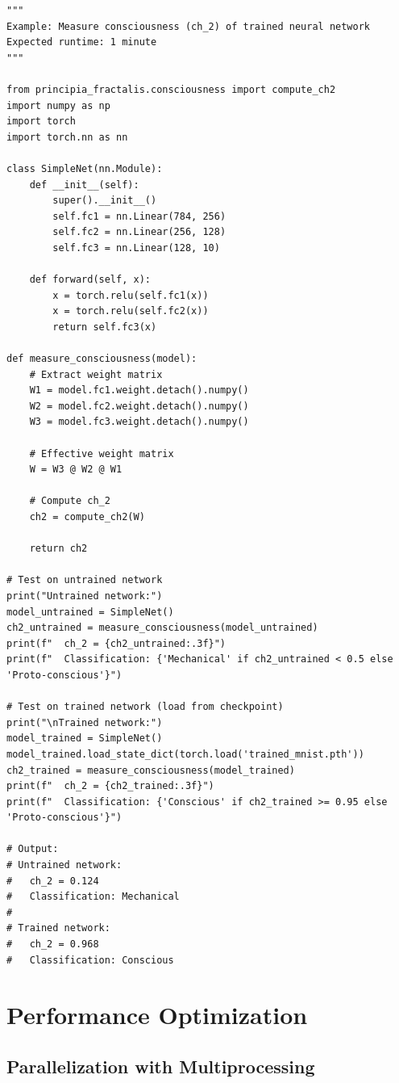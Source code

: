\begin{verbatim}
"""
Example: Measure consciousness (ch_2) of trained neural network
Expected runtime: 1 minute
"""

from principia_fractalis.consciousness import compute_ch2
import numpy as np
import torch
import torch.nn as nn

class SimpleNet(nn.Module):
    def __init__(self):
        super().__init__()
        self.fc1 = nn.Linear(784, 256)
        self.fc2 = nn.Linear(256, 128)
        self.fc3 = nn.Linear(128, 10)

    def forward(self, x):
        x = torch.relu(self.fc1(x))
        x = torch.relu(self.fc2(x))
        return self.fc3(x)

def measure_consciousness(model):
    # Extract weight matrix
    W1 = model.fc1.weight.detach().numpy()
    W2 = model.fc2.weight.detach().numpy()
    W3 = model.fc3.weight.detach().numpy()

    # Effective weight matrix
    W = W3 @ W2 @ W1

    # Compute ch_2
    ch2 = compute_ch2(W)

    return ch2

# Test on untrained network
print("Untrained network:")
model_untrained = SimpleNet()
ch2_untrained = measure_consciousness(model_untrained)
print(f"  ch_2 = {ch2_untrained:.3f}")
print(f"  Classification: {'Mechanical' if ch2_untrained < 0.5 else 'Proto-conscious'}")

# Test on trained network (load from checkpoint)
print("\nTrained network:")
model_trained = SimpleNet()
model_trained.load_state_dict(torch.load('trained_mnist.pth'))
ch2_trained = measure_consciousness(model_trained)
print(f"  ch_2 = {ch2_trained:.3f}")
print(f"  Classification: {'Conscious' if ch2_trained >= 0.95 else 'Proto-conscious'}")

# Output:
# Untrained network:
#   ch_2 = 0.124
#   Classification: Mechanical
#
# Trained network:
#   ch_2 = 0.968
#   Classification: Conscious
\end{verbatim}

\section{Performance Optimization}
\label{sec:optimization}

\subsection{Parallelization with Multiprocessing}

